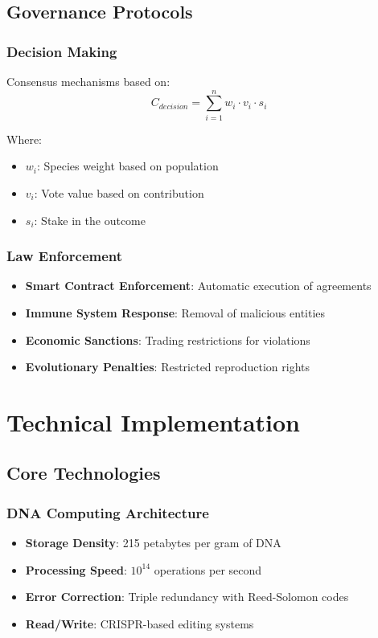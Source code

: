 \documentclass[11pt,a4paper]{article}
\begin{document}
\subsection{Governance Protocols}

\subsubsection{Decision Making}
Consensus mechanisms based on:
\begin{equation}
C_{decision} = \sum_{i=1}^{n} w_i \cdot v_i \cdot s_i
\end{equation}

Where:
\begin{itemize}
    \item $w_i$: Species weight based on population
    \item $v_i$: Vote value based on contribution
    \item $s_i$: Stake in the outcome
\end{itemize}

\subsubsection{Law Enforcement}
\begin{itemize}
    \item \textbf{Smart Contract Enforcement}: Automatic execution of agreements
    \item \textbf{Immune System Response}: Removal of malicious entities
    \item \textbf{Economic Sanctions}: Trading restrictions for violations
    \item \textbf{Evolutionary Penalties}: Restricted reproduction rights
\end{itemize}

\section{Technical Implementation}
\label{sec:implementation}

\subsection{Core Technologies}

\subsubsection{DNA Computing Architecture}
\begin{itemize}
    \item \textbf{Storage Density}: 215 petabytes per gram of DNA
    \item \textbf{Processing Speed}: $10^{14}$ operations per second
    \item \textbf{Error Correction}: Triple redundancy with Reed-Solomon codes
    \item \textbf{Read/Write}: CRISPR-based editing systems
\end{itemize}
\end{document}
